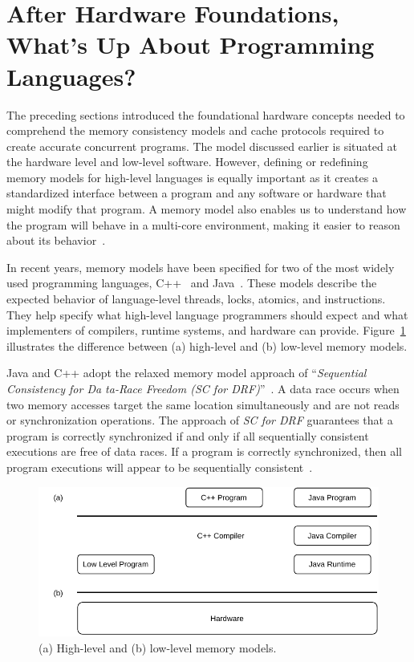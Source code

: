 \section{After Hardware Foundations, What's Up About Programming Languages?}

The preceding sections introduced the foundational hardware concepts needed to comprehend the memory consistency models and cache protocols required to create accurate concurrent programs. The model discussed earlier is situated at the hardware level and low-level software. However, defining or redefining memory models for high-level languages is equally important as it creates a standardized interface between a program and any software or hardware that might modify that program. A memory model also enables us to understand how the program will behave in a multi-core environment, making it easier to reason about its behavior~\cite{DBLP_journals_cacm_AdveB10, DBLP_series_synthesis_2020Nagarajan}.

In recent years, memory models have been specified for two of the most widely used programming languages, C++~\cite{DBLP_conf_pldi_BoehmA08} and Java~\cite{DBLP_conf_popl_MansonPA05}. These models describe the expected behavior of language-level threads, locks, atomics, and \RMW{} instructions. They help specify what high-level language programmers should expect and what implementers of compilers, runtime systems, and hardware can provide. Figure~\ref{fig:memory-models} illustrates the difference between (a) high-level and (b) low-level memory models.

Java and C++ adopt the relaxed memory model approach of ``\emph{Sequential Consistency for Da
ta-Race Freedom (SC for DRF)}''~\cite{DBLP_conf_isca_AdveH90}.  A data race occurs when two memory accesses target the same location simultaneously and are not reads or synchronization operations. The approach of \emph{SC for DRF} guarantees that a program is correctly synchronized if and only if all sequentially consistent executions are free of data races. If a program is correctly synchronized, then all program executions will appear to be sequentially consistent~\cite{javamemorymodelspec}.

\begin{figure}[ht!]
    \centering
    \includegraphics[width=0.9\linewidth]{contents//figures/III_3_memory_model.pdf}
    \caption{(a) High-level and (b) low-level memory models.}
    \label{fig:memory-models}
\end{figure}

